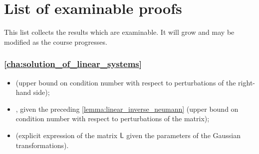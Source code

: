 \chapter*{List of examinable proofs}%
This list collects the results which are examinable.
It will grow and may be modified as the course progresses.

\subsection*{\cref{cha:solution_of_linear_systems}}%

\begin{itemize}
    \item {} (upper bound on condition number with respect to perturbations of the right-hand side);
    \item {}, given the preceding \cref{lemma:linear_inverse_neumann} (upper bound on condition number with respect to perturbations of the matrix);
    \item {} (explicit expression of the matrix $\mathsf L$ given the parameters of the Gaussian transformations).
\end{itemize}
